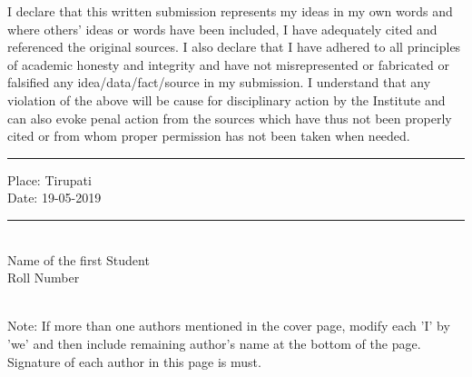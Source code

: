 \declaration

\vspace*{0.5in}

I declare that this written submission represents my ideas in my own words and where
others' ideas or words have been included, I have adequately cited and referenced the original
sources. I also declare that I have adhered to all principles of academic honesty and integrity
and have not misrepresented or fabricated or falsified any idea/data/fact/source in my
submission. I understand that any violation of the above will be cause for disciplinary action
by the Institute and can also evoke penal action from the sources which have thus not been
properly cited or from whom proper permission has not been taken when needed.

\vspace*{1.5in}

\begin{singlespacing}
	\parbox[t]{4cm}{\hrule height 0pt width 0pt
	\noindent Place: Tirupati\\
	\noindent Date: 19-05-2019 \\	
}
\hfill
	\parbox[t]{5cm}{\hrule height 0pt width 0pt
	 \\
	\noindent Name of the first Student \\ 
	\noindent Roll Number\\
}
\end{singlespacing}
\\Note: If more than one authors mentioned in the cover page, modify each 'I' by 'we' and then include remaining author's name at the bottom of the page. Signature of each author in this page is must. 



